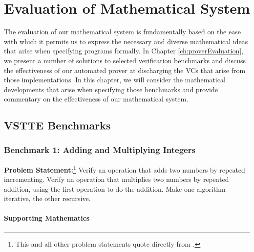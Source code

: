 


\chapter{Evaluation of Mathematical System\label{ch:mathEvaluation}}
The evaluation of our mathematical system is fundamentally based on the ease with which it permits us to express the necessary and diverse mathematical ideas that arise when specifying programs formally.  In Chapter \ref{ch:proverEvaluation}, we present a number of solutions to selected verification benchmarks and discuss the effectiveness of our automated prover at discharging the VCs that arise from those implementations.  In this chapter, we will consider the mathematical developments that arise when specifying those benchmarks and provide commentary on the effectiveness of our mathematical system.


\section{VSTTE Benchmarks}

	\subsection{Benchmark 1: Adding and Multiplying Integers}	%

\textbf{Problem Statement:}\footnote{This and all other problem statements quote directly from \cite{Benchmarks}.} Verify an operation that adds two numbers by repeated incrementing. Verify an operation that multiplies two numbers by repeated addition, using the first operation to do the addition. Make one algorithm iterative, the other recursive.

		\subsubsection{Supporting Mathematics}	%

